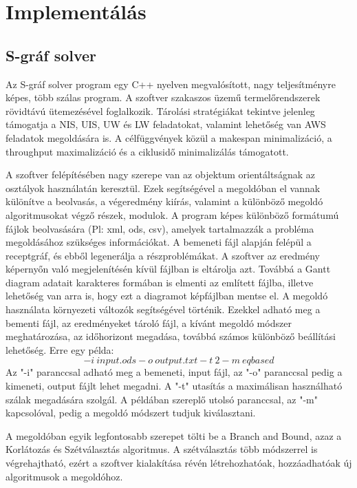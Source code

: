 \chapter{Implementálás}
\section{S-gráf solver}
Az S-gráf solver program egy C++ nyelven megvalósított, nagy teljesítményre képes, több szálas program. A szoftver szakaszos üzemű termelőrendszerek rövidtávú ütemezésével foglalkozik. Tárolási stratégiákat tekintve jelenleg támogatja a NIS, UIS, UW és LW feladatokat, valamint lehetőség van AWS feladatok megoldására is. A célfüggvények közül a makespan minimalizáció, a throughput maximalizáció és a ciklusidő minimalizálás támogatott. 

A szoftver felépítésében nagy szerepe van az objektum orientáltságnak az osztályok használatán keresztül. Ezek segítségével a megoldóban el vannak különítve a beolvasás, a végeredmény kiírás, valamint a különböző megoldó algoritmusokat végző részek, modulok. A program képes különböző formátumú fájlok beolvasására (Pl: xml, ods, csv), amelyek tartalmazzák a probléma megoldásához szükséges információkat. A bemeneti fájl alapján felépül a receptgráf, és ebből legenerálja a részproblémákat. A szoftver az eredmény képernyőn való megjelenítésén kívül fájlban is eltárolja azt. Továbbá a Gantt diagram adatait karakteres formában is elmenti az említett fájlba, illetve lehetőség van arra is, hogy ezt a diagramot képfájlban mentse el. A megoldó használata környezeti változók segítségével történik. Ezekkel adható meg a bementi fájl, az eredményeket tároló fájl, a kívánt megoldó módszer meghatározása, az időhorizont megadása, továbbá számos különböző beállítási lehetőség. Erre egy példa: $$-i\:input.ods -o\: output.txt -t\:2 -m\:eqbased$$ Az "-i" paranccsal adható meg a bemeneti, input fájl, az "-o" paranccsal pedig a kimeneti, output fájlt lehet megadni. A "-t" utasítás a maximálisan használható szálak megadására szolgál. A példában szereplő utolsó paranccsal, az "-m" kapcsolóval, pedig a megoldó módszert tudjuk kiválasztani.

A megoldóban egyik legfontosabb szerepet tölti be a Branch and Bound, azaz a Korlátozás és Szétválasztás algoritmus. A szétválasztás több módszerrel is végrehajtható, ezért a szoftver kialakítása révén létrehozhatóak, hozzáadhatóak új algoritmusok a megoldóhoz.

